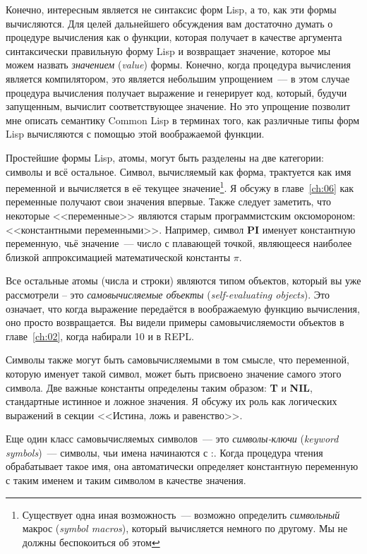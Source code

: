 Конечно, интересным является не синтаксис форм Lisp, а то, как эти формы вычисляются. Для
целей дальнейшего обсуждения вам достаточно думать о процедуре вычисления как о функции,
которая получает в качестве аргумента синтаксически правильную форму Lisp и возвращает
значение, которое мы можем назвать \textit{значением} (\textit{value}) формы. Конечно,
когда процедура вычисления является компилятором, это является небольшим упрощением~--- в
этом случае процедура вычисления получает выражение и генерирует код, который, будучи
запущенным, вычислит соответствующее значение. Но это упрощение позволит мне описать
семантику Common Lisp в терминах того, как различные типы форм Lisp вычисляются с помощью
этой воображаемой функции.

Простейшие формы Lisp, атомы, могут быть разделены на две категории: символы и всё
остальное. Символ, вычисляемый как форма, трактуется как имя переменной и вычисляется в её
текущее значение\footnote{Существует одна иная возможность~--- возможно определить
  \textit{символьный} макрос (\textit{symbol macros}), который вычисляется немного по
  другому. Мы не должны беспокоиться об этом}. Я обсужу в главе~\ref{ch:06} как переменные получают
свои значения впервые. Также следует заметить, что некоторые <<переменные>> являются старым
программистским оксюмороном: <<константными переменными>>. Например, символ \textbf{PI}
именует константную переменную, чьё значение~--- число с плавающей точкой, являющееся
наиболее близкой аппроксимацией математической константы $\pi$.

Все остальные атомы (числа и строки) являются типом объектов, который вы уже рассмотрели
-- это \textit{самовычисляемые объекты} (\textit{self-evaluating objects}). Это означает,
что когда выражение передаётся в воображаемую функцию вычисления, оно просто
возвращается. Вы видели примеры самовычисляемости объектов в главе~\ref{ch:02}, когда набирали 10 и
 в REPL.

Символы также могут быть самовычисляемыми в том смысле, что переменной, которую именует
такой символ, может быть присвоено значение самого этого символа. Две важные константы
определены таким образом: \textbf{T} и \textbf{NIL}, стандартные истинное и ложное
значения. Я обсужу их роль как логических выражений в секции <<Истина, ложь и равенство>>.

Еще один класс самовычисляемых символов~--- это \textit{символы-ключи} (\textit{keyword
  symbols})~--- символы, чьи имена начинаются с :. Когда процедура чтения обрабатывает
такое имя, она автоматически определяет константную переменную с таким именем и таким
символом в качестве значения.

